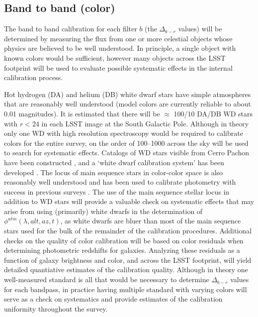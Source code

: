 \documentclass[12pt,preprint]{aastex}
\begin{document}
\subsection{Band to band (color)}

The band to band calibration for each filter $b$ (the $\Delta_{b-r}$
values) will be determined by measuring the flux from one or more
celestial objects whose physics are believed to be well
understood. In principle, a single object with known colors would be
sufficient, however many objects across the LSST footprint
will be used to evaluate possible systematic effects in the internal
calibration process. 

Hot hydrogen (DA) and helium (DB) white dwarf stars have simple
atmospheres that are reasonably well understood (model colors are
currently reliable to about 0.01 magnitudes). It is estimated that
there will be $\approx$ 100/10 DA/DB WD stars with $r<24$ in each LSST
image at the South Galactic Pole. Although in theory only one WD
with high resolution spectroscopy would be
required to calibrate colors for the entire survey, on the order of
100--1000 across the sky will be used to search for systematic effects.
Catalogs of WD stars visible from Cerro Pachon have been constructed
\citep{1992JRASC..86..309B, 2004AJ....128.3053B}, and a `white dwarf
calibration system' has been developed
\citep{2006AJ....132.1221H}. The locus of main sequence stars in
color-color space is also reasonably well understood and has been used
to calibrate photometry with success in previous surveys
\citep{2004MNRAS.352.1255M, Ivezic2007}. The use of the main
sequence stellar locus in addition to WD stars will provide a valuable
check on systematic effects that may arise from using (primarily)
white dwarfs in the determination of $\phi^{atm}(\lambda,alt,az,t)$,
as white dwarfs are bluer than most of the main sequence stars used
for the bulk of the remainder of the calibration procedures.
Additional checks on the quality of color calibration will be based on
color residuals when determining photometric redshifts for
galaxies. Analyzing these residuals as a function of galaxy brightness
and color, and across the LSST footprint, will yield detailed
quantiative estimates of the calibration quality.  Although in theory
one well-measured standard is all that would be necessary to determine
$\Delta_{b-r}$ values for each bandpass, in practice having multiple
standard with varying colors will serve as a check on systematics and
provide estimates of the calibration uniformity throughout the survey.
\end{document}

